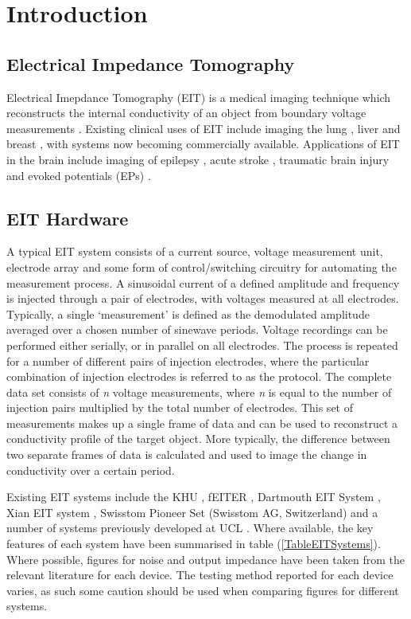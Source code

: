\section{Introduction}

\subsection{Electrical Impedance Tomography}
Electrical Imepdance Tomography (EIT) is a medical imaging technique which reconstructs the internal conductivity of an object from boundary voltage measurements \cite{Metherall1996}. Existing clinical uses of EIT include imaging the lung \cite{Frerichs_2000}, liver \cite{YOU_2009} and breast \cite{Halter}, with systems now becoming commercially available. Applications of EIT in the brain include imaging of epilepsy \cite{Vongerichten_2016,Fabrizi_2006}, acute stroke \cite{Dowrick_2016}, traumatic brain injury \cite{Manwaring2013} and evoked potentials (EPs) \cite{Aristovich_2016}. 

\subsection{EIT Hardware}

A typical EIT system consists of a current source, voltage measurement unit, electrode array and some form of control/switching circuitry for automating the measurement process. A sinusoidal current of a defined amplitude and frequency is injected through a pair of electrodes, with voltages measured at all electrodes. Typically, a single `measurement' is defined as the demodulated amplitude averaged over a chosen number of sinewave periods. Voltage recordings can be performed either serially, or in parallel on all electrodes. The process is repeated for a number of different pairs of injection electrodes, where the particular combination of injection electrodes is referred to as the protocol. The complete data set consists of \emph{n} voltage measurements, where \emph{n} is equal to the number of injection pairs multiplied by the total number of electrodes. This set of measurements makes up a single frame of data and can be used to reconstruct a conductivity profile of the target object. More typically, the difference between two separate frames of data is calculated and used to image the change in conductivity over a certain period.

Existing EIT systems include the KHU \cite{Hun_Wi_2014}, fEITER \cite{McCann_2011}, Dartmouth EIT System \cite{khan}, Xian EIT system \cite{Shi_Xuetao_2005}, Swisstom Pioneer Set (Swisstom AG, Switzerland) and a number of systems previously developed at UCL \cite{Oh2011} \cite{McEwan_2006}. Where available, the key features of each system have been summarised in table (\ref{TableEITSystems}). Where possible, 
figures for noise and output impedance have been taken from the relevant literature for each device. The testing method reported for each device varies, as such some caution should be used when comparing figures for different systems.
